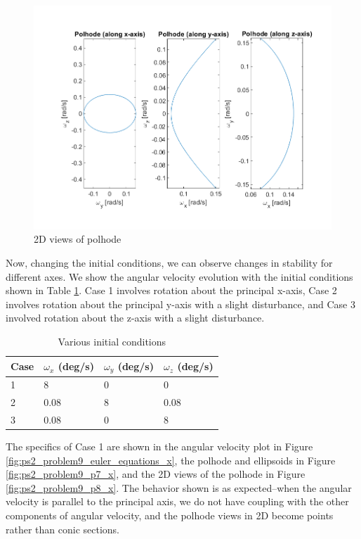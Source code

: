 \begin{figure}[H]
\centering
\includegraphics[scale=0.7]{Images/ps2_problem8.png}
\caption{2D views of polhode}
\label{fig:ps2_problem8}
\end{figure}

Now, changing the initial conditions, we can observe changes in stability for different axes. We show the angular velocity evolution with the initial conditions shown in Table \ref{tab:ps2_problem9_conditions}. Case 1 involves rotation about the principal x-axis, Case 2 involves rotation about the principal y-axis with a slight disturbance, and Case 3 involved rotation about the z-axis with a slight disturbance.

\begin{table}[H]
\caption{Various initial conditions}
\centering
\label{tab:ps2_problem9_conditions}
\begin{tabular}{|l|l|l|l|}
\hline
\textbf{Case} & \textbf{$\omega_x$ (deg/s)} & \textbf{$\omega_y$ (deg/s)} & \textbf{$\omega_z$ (deg/s)} \\ \hline
1             & 8                     & 0                     & 0                     \\ \hline
2             & 0.08                  & 8                     & 0.08                  \\ \hline
3             & 0.08                  & 0                     & 8                     \\ \hline
\end{tabular}
\end{table}

The specifics of Case 1 are shown in the angular velocity plot in Figure \ref{fig:ps2_problem9_euler_equations_x}, the polhode and ellipsoids in Figure \ref{fig:ps2_problem9_p7_x}, and the 2D views of the polhode in Figure \ref{fig:ps2_problem9_p8_x}. The behavior shown is as expected–when the angular velocity is parallel to the principal axis, we do not have coupling with the other components of angular velocity, and the polhode views in 2D become points rather than conic sections.

